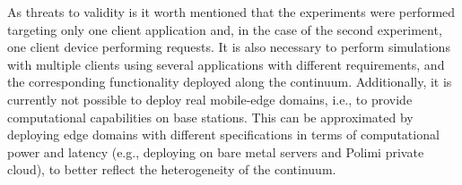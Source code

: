 
As threats to validity is it worth mentioned that the experiments were performed targeting only one client application and, in the case of the second experiment, one client device performing requests. It is also necessary to perform simulations with multiple clients using several applications with different requirements, and the corresponding functionality deployed along the continuum. Additionally, it is currently not possible to deploy real mobile-edge domains, i.e., to provide computational capabilities on base stations. This can be approximated by deploying edge domains with different specifications in terms of computational power and latency (e.g., deploying on bare metal servers and Polimi private cloud), to better reflect the heterogeneity of the continuum. 




